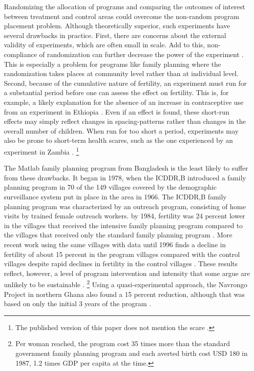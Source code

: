 \documentclass[letterpaper,12pt]{article}
\begin{document}
Randomizing the allocation of programs and comparing the outcomes of 
interest between treatment and control areas could overcome the non-random 
program placement problem.
Although theoretically superior, such experiments have several drawbacks in practice.
First, there are concerns about the external validity of experiments, which
are often small in scale.
Add to this, non-compliance of randomization can further decrease
the power of the experiment \citep{Desai2011}.
This is especially a problem for programs like family planning where the 
randomization takes places at community level rather than at individual level.
Second, because of the cumulative nature of fertility, an experiment must 
run for a substantial period before one can assess the effect on 
fertility.
This is, for example, a likely explanation for the absence of an 
increase in contraceptive use from an experiment in Ethiopia \citep{Desai2011}.
Even if an effect is found, these short-run effects may simply 
reflect changes in spacing-patterns rather than
changes in the overall number of children.
When run for too short a period, experiments may also be prone to short-term 
health scares, such as the one experienced by an experiment in 
Zambia \citep{Ashraf2009}.%
\footnote{
The published version of this paper does not mention the scare \citep{Ashraf2014}.
}

The Matlab family planning program from Bangladesh is the
least likely to suffer from these drawbacks.
It began in 1978, when the ICDDR,B introduced a family planning program 
in 70 of the 149 villages covered by the demographic surveillance system
put in place in the area in 1966.
The ICDDR,B family planning program was characterized by an outreach program,
consisting of home visits by trained female outreach workers.
by 1984, fertility was 24 percent lower in the villages that received the 
intensive family planning program compared to the villages 
that received only the standard family planning program \citep{Phillips1988}.
More recent work using the same villages with data until 1996 finds a decline in 
fertility of about 15 percent in the program villages compared with the control 
villages despite rapid declines in fertility in the control villages 
\citep{Sinha2005,Joshi2007}.
These results reflect, however, a level of program intervention and intensity
that some argue are unlikely to be sustainable \citep{pritchett94a}.%
\footnote{
Per woman reached, the program cost 35 times more than the standard government family 
planning program and each averted birth cost USD 180 in 1987, 1.2 times GDP per capita 
at the time.
}
Using a quasi-experimental approach, the Navrongo Project in northern Ghana also
found a 15 percent reduction, although that was based on only the initial 3 years 
of the program \citep{Debpuur2002}.
\end{document}
